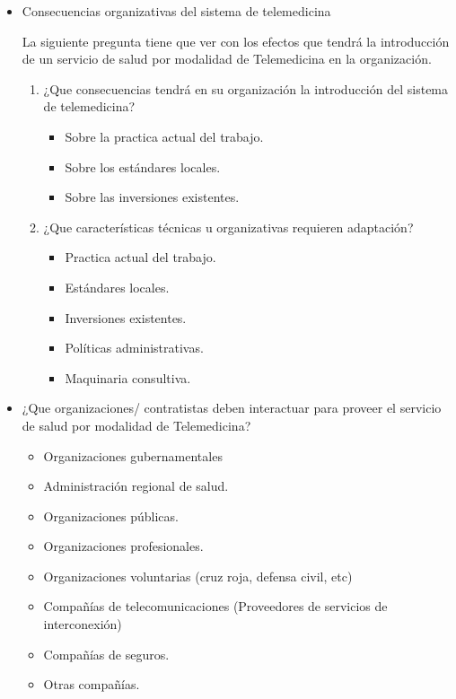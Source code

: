 \begin{itemize}
\item Consecuencias organizativas del sistema de telemedicina

La siguiente pregunta tiene que ver con los efectos que tendrá la introducción de un servicio de salud por modalidad de Telemedicina en la organización. 


\begin{enumerate}
\item ¿Que consecuencias tendrá en su organización la introducción del sistema de telemedicina? 

\begin{itemize}
\item Sobre la practica actual del trabajo.
\item Sobre los estándares locales. 
\item Sobre las inversiones existentes.
\end{itemize}

\item ¿Que características técnicas u organizativas requieren adaptación? 

\begin{itemize}
\item Practica actual del trabajo.
\item Estándares locales.
\item Inversiones existentes.
\item Políticas administrativas.
\item Maquinaria consultiva.
\end{itemize}

\end{enumerate}

\item ¿Que organizaciones/ contratistas deben interactuar para proveer el servicio de salud por modalidad de Telemedicina? 

\begin{itemize}
\item Organizaciones gubernamentales 
\item Administración regional de salud. 
\item Organizaciones públicas. 
\item Organizaciones profesionales. 
\item Organizaciones voluntarias (cruz roja, defensa civil, etc) 
\item Compañías de telecomunicaciones (Proveedores de servicios de interconexión) 
\item Compañías de seguros.
\item Otras compañías.
\end{itemize}
\end{itemize}

